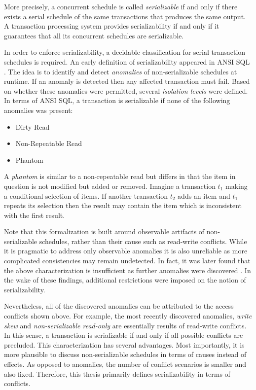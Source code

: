 More precisely, a concurrent schedule is called \emph{serializable} if and only
if there exists a serial schedule of the same transactions that produces the
same output. A transaction processing system provides serializability if and
only if it guarantees that all its concurrent schedules are serializable.


In order to enforce serializability, a decidable classification for serial
transaction schedules is required. An early definition of serializability
appeared in ANSI SQL \cite{berenson1995critique, melton1993understanding}. The
idea is to identify and detect \emph{anomalies} of non-serializable schedules at
runtime. If an anomaly is detected then any affected transaction must fail.
Based on whether these anomalies were permitted, several \emph{isolation levels}
were defined. In terms of ANSI SQL, a transaction is serializable if none of the
following anomalies was present:

\begin{itemize}
    \item Dirty Read
    \item Non-Repeatable Read
    \item Phantom
\end{itemize}

A \emph{phantom} is similar to a non-repeatable read but differs in that the
item in question is not modified but added or removed. Imagine a transaction
$t_1$ making a conditional selection of items. If another transaction $t_2$ adds
an item and $t_1$ repeats its selection then the result may contain the item
which is inconsistent with the first result.

Note that this formalization is built around observable artifacts of
non-serializable schedules, rather than their cause such as read-write
conflicts. While it is pragmatic to address only observable anomalies it is also
unreliable as more complicated consistencies may remain undetected. In fact, it
was later found that the above characterization is insufficient as further
anomalies were discovered \cite{berenson1995critique, fekete2004read}. In the
wake of these findings, additional restrictions were imposed on the notion of
serializability.

Nevertheless, all of the discovered anomalies can be attributed to the access
conflicts shown above. For example, the most recently discovered anomalies,
\emph{write skew} and \emph{non-serializable read-only} are essentially results
of read-write conflicts. In this sense, a transaction is serializable if and
only if all possible conflicts are precluded. This characterization has several
advantages. Most importantly, it is more plausible to discuss non-serializable
schedules in terms of causes instead of effects. As opposed to anomalies, the
number of conflict scenarios is smaller and also fixed. Therefore, this thesis
primarily defines serializability in terms of conflicts.
